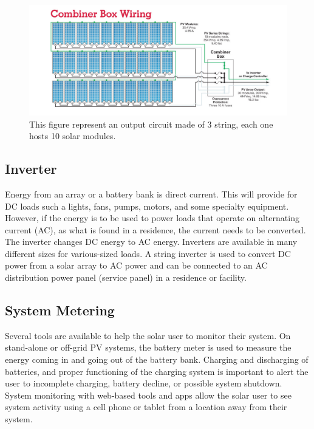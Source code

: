\begin{figure}[H]
	\centering
	\includegraphics[width=\textwidth, keepaspectratio]{chapters/1_introduction/imgs/junctionbox.png}
	\caption{This figure represent an output circuit made of 3 string, each one hosts 10 solar modules\cite{pvarizona}.}
	\label{fig:outcircuit}
\end{figure}


\subsection{Inverter}
Energy from an array or a battery bank is direct current. This will provide for DC loads such a lights, fans,
pumps, motors, and some specialty equipment. However,
if the energy is to be used to power loads that operate on
alternating current (AC), as what is found in a residence, the
current needs to be converted. The inverter changes DC energy
to AC energy. Inverters are available in many different sizes
for various-sized loads.
A string inverter is used to convert DC power from a solar
array to AC power and can be connected to an AC distribution
power panel (service panel) in a residence or facility\cite{pvarizona}.


\subsection{System Metering}
Several tools are available to help the solar user to monitor
their system. On stand-alone or off-grid PV systems, the
battery meter is used to measure the energy coming in and
going out of the battery bank. Charging and discharging of
batteries, and proper functioning of the charging system is
important to alert the user to incomplete charging, battery
decline, or possible system shutdown\cite{pvarizona}. System monitoring
with web-based tools and apps allow the solar user to see
system activity using a cell phone or tablet from a location
away from their system.